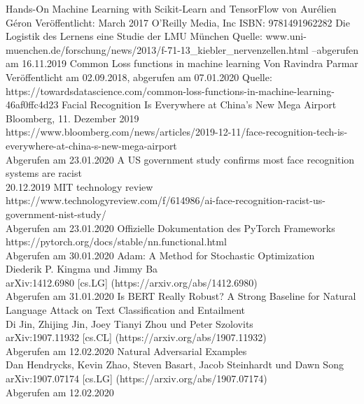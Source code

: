 \documentclass[11pt]{article}
\begin{document}
\begin{thebibliography}{99}
	Hands-On Machine Learning with Scikit-Learn and TensorFlow\newline
	von Aurélien Géron\newline
	Veröffentlicht: March 2017 O'Reilly Media, Inc\newline
	ISBN: 9781491962282
	Die Logistik des Lernens eine Studie der LMU München\newline
	Quelle: www.uni-muenchen.de/forschung/news/2013/\newline f-71-13\_kiebler\_nervenzellen.html --abgerufen am 16.11.2019
	Common Loss functions in machine learning\newline
	Von Ravindra Parmar\newline
	Veröffentlicht am 02.09.2018, abgerufen am 07.01.2020\newline
	Quelle: https://towardsdatascience.com/common-loss-functions-in-machine-learning-46af0ffc4d23 
	Facial Recognition Is Everywhere at China’s New Mega Airport\\
	Bloomberg, 11. Dezember 2019\\
	https://www.bloomberg.com/news/articles/2019-12-11/face-recognition-tech-is-everywhere-at-china-s-new-mega-airport\\
	Abgerufen am 23.01.2020
	A US government study confirms most face recognition systems are racist\\
	20.12.2019 MIT technology review\\
	https://www.technologyreview.com/f/614986/ai-face-recognition-racist-us-government-nist-study/\\
	Abgerufen am 23.01.2020
	Offizielle Dokumentation des PyTorch Frameworks\\
	https://pytorch.org/docs/stable/nn.functional.html\\
	Abgerufen am 30.01.2020
	Adam: A Method for Stochastic Optimization\\
	Diederik P. Kingma und Jimmy Ba\\
	arXiv:1412.6980 [cs.LG] (https://arxiv.org/abs/1412.6980)\\
	Abgerufen am 31.01.2020
	Is BERT Really Robust? A Strong Baseline for Natural Language Attack on Text Classification and Entailment\\
	Di Jin, Zhijing Jin, Joey Tianyi Zhou und Peter Szolovits\\
	arXiv:1907.11932 [cs.CL] (https://arxiv.org/abs/1907.11932)\\
	Abgerufen am 12.02.2020
	Natural Adversarial Examples\\
	Dan Hendrycks, Kevin Zhao, Steven Basart, Jacob Steinhardt und Dawn Song\\
	arXiv:1907.07174 [cs.LG] (https://arxiv.org/abs/1907.07174)\\
	Abgerufen am 12.02.2020
	
\end{thebibliography}
\listoffigures
\end{document}
